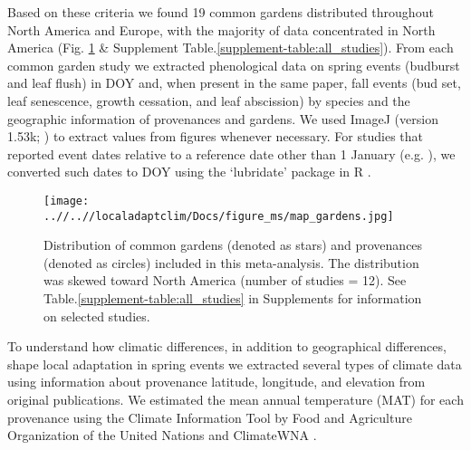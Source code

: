 \documentclass{article}
\begin{document}
Based on these criteria we found 19 common gardens distributed throughout North America and Europe, with the majority of data concentrated in North America (Fig. \ref{figure:map_gardens} \& Supplement Table.\ref{supplement-table:all_studies}). From each common garden study we extracted phenological data on spring events (budburst and leaf flush) in DOY and, when present in the same paper, fall events (bud set, leaf senescence, growth cessation, and leaf abscission) by species and the geographic information of provenances and gardens. We used ImageJ (version 1.53k; \citealp{schneider_rasband_eliceiri_2012}) to extract values from figures whenever necessary. For studies that reported event dates relative to a reference date other than 1 January (e.g. \citealp{Rehfeldt1994}), we converted such dates to DOY using the `lubridate' package in R \citep{Grolemund11}. %
\begin{figure}[!h] 
    \centering
 \texttt{[image: ..//..//localadaptclim/Docs/figure\_ms/map\_gardens.jpg]}
    \caption{Distribution of common gardens (denoted as stars) and provenances (denoted as circles) included in this meta-analysis. The distribution was skewed toward North America (number of studies = 12). See Table.\ref{supplement-table:all_studies} in Supplements for information on selected studies.}  %
    \label{figure:map_gardens}
\end{figure}
\newline
To understand how climatic differences, in addition to geographical differences, shape local adaptation in spring events we extracted several types of climate data using information about provenance latitude, longitude, and elevation from original publications. We estimated the mean annual temperature (MAT) for each provenance using the Climate Information Tool by Food and Agriculture Organization of the United Nations \citep{FAO2022}and ClimateWNA \citep{wang2016}. 
\end{document}
